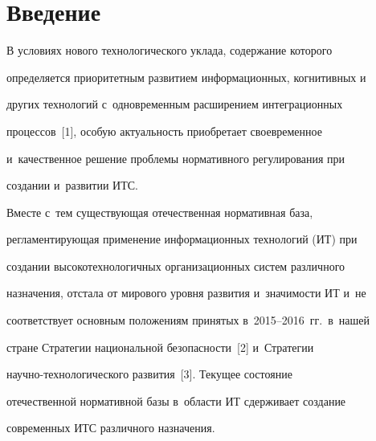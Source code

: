 















      \thispagestyle{headings}


      


      \vspace*{-18pt}





\section{Введение}





     В условиях нового технологического уклада, содержание которого 


определяется приоритетным развитием информационных, когнитивных и~


других технологий с~одновременным расширением интеграционных 


процессов~[1], особую актуальность приобретает своевременное 


и~качественное решение проблемы нормативного регулирования при 


создании и~развитии ИТС. 


Вместе с~тем существующая отечественная нормативная база, 


регламентирующая применение информационных технологий (ИТ) при 


создании высокотехнологичных организационных систем различного 


назначения, отстала от мирового уровня развития и~значимости ИТ и~не 


соответствует основным положениям принятых в~2015--2016~гг.\ в~нашей 


стране Стратегии национальной безопасности~[2] и~Стратегии  


на\-уч\-но-тех\-но\-ло\-ги\-че\-ско\-го развития~[3]. Текущее состояние 


отечественной нормативной базы в~области ИТ сдерживает создание 


современных ИТС различного назначения. 


